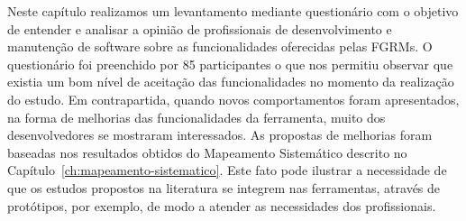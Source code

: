 Neste capítulo realizamos um levantamento mediante questionário com o objetivo
de entender e analisar a opinião de profissionais de desenvolvimento e
manutenção de software sobre as funcionalidades oferecidas pelas FGRMs. O
questionário foi preenchido por 85 participantes o que nos permitiu observar que
existia um bom nível de aceitação das funcionalidades no momento da realização
do estudo. Em contrapartida, quando novos comportamentos foram apresentados, na
forma de melhorias das funcionalidades da ferramenta, muito dos desenvolvedores
se mostraram interessados. As propostas de melhorias foram baseadas nos
resultados obtidos do Mapeamento Sistemático descrito no
Capítulo~\ref{ch:mapeamento-sistematico}. Este fato pode ilustrar a necessidade
de que os estudos propostos na literatura se integrem nas ferramentas, através
de protótipos, por exemplo, de modo a atender as necessidades dos profissionais.
